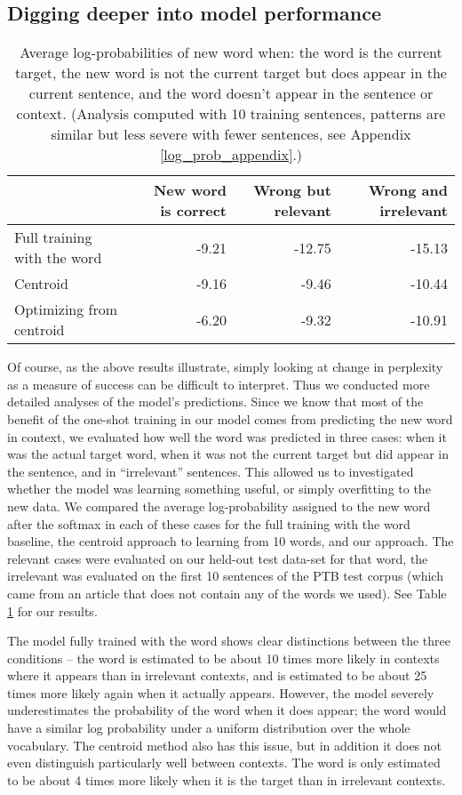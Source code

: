 \documentclass{article}
\begin{document}
\subsection{Digging deeper into model performance} \label{digging_deeper}
\begin{table}[ht]
\centering
\begin{tabular}{|l|rrr|}
  \hline
  & New word is correct & Wrong but relevant & Wrong and irrelevant \\ 
  \hline
  Full training with the word & -9.21 & -12.75 & -15.13 \\ 
  Centroid & -9.16 & -9.46 & -10.44 \\ 
  Optimizing from centroid & -6.20 & -9.32 & -10.91 \\ 
   \hline
\end{tabular}
\caption{Average log-probabilities of new word when: the word is the current target, the new word is not the current target but does appear in the current sentence, and the word doesn't appear in the sentence or context. (Analysis computed with 10 training sentences, patterns are similar but less severe with fewer sentences, see Appendix \ref{log_prob_appendix}.)} \label{word_prob_table} 
\end{table}
Of course, as the above results illustrate, simply looking at change in perplexity as a measure of success can be difficult to interpret. Thus we conducted more detailed analyses of the model's predictions. Since we know that most of the benefit of the one-shot training in our model comes from predicting the new word in context, we evaluated how well the word was predicted in three cases: when it was the actual target word, when it was not the current target but did appear in the sentence, and in ``irrelevant'' sentences. This allowed us to investigated whether the model was learning something useful, or simply overfitting to the new data. We compared the average log-probability assigned to the new word after the softmax in each of these cases for the full training with the word baseline, the centroid approach to learning from 10 words, and our approach. The relevant cases were evaluated on our held-out test data-set for that word, the irrelevant was evaluated on the first 10 sentences of the PTB test corpus (which came from an article that does not contain any of the words we used). See Table \ref{word_prob_table} for our results. \par 
The model fully trained with the word shows clear distinctions between the three conditions -- the word is estimated to be about 10 times more likely in contexts where it appears than in irrelevant contexts, and is estimated to be about 25 times more likely again when it actually appears. However, the model severely underestimates the probability of the word when it does appear; the word would have a similar log probability under a uniform distribution over the whole vocabulary. The centroid method also has this issue, but in addition it does not even distinguish particularly well between contexts. The word is only estimated to be about 4 times more likely when it is the target than in irrelevant contexts. \par
\end{document}
